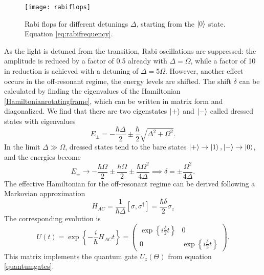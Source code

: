 \begin{figure}[H]
\centering
\texttt{[image: rabiflops]}
\caption{Rabi flops for different detunings $\Delta$, starting from the $\ket{0}$ state. Equation \eqref{eq:rabifrequency}.}
\label{rabiflops}
\end{figure}
As the light is detuned from the transition, Rabi oscillations are suppressed: the amplitude is reduced by a factor of 0.5 already with $\Delta = \Omega$, while a factor of 10 in reduction is achieved with a detuning of $\Delta = 5\Omega$. However, another effect occurs in the off-resonant regime, the energy levels are shifted.
The shift $\delta$ can be calculated by finding the eigenvalues of the Hamiltonian \eqref{Hamiltonianrotatingframe}, which can be written in matrix form and diagonalized. We find that there are two eigenstates $\ket{+}$ and $\ket{-}$ called dressed states with eigenvalues
\begin{equation}
E_{\pm} = -\frac{\hbar\Delta}{2} \pm \frac{\hbar}{2}\sqrt{\Delta^2 +\Omega^2}.
\end{equation}
In the limit $\Delta \gg \Omega$, dressed states tend to the bare states $\ket{+} \to \ket{1},\ket{-}\to \ket{0}$, and the energies become
\begin{equation}
\label{eq:starkshift}
E_{\pm} \to -\frac{\hbar \Omega}{2} \pm \frac{\hbar \Omega}{2} \pm \frac{\hbar \Omega^2}{4\Delta} \implies \delta = \pm\frac{\Omega^2}{4\Delta}.
\end{equation}
The effective Hamiltonian for the off-resonant regime can be derived following a Markovian approximation \cite{acstarkhamiltonian}
\begin{equation}
H_{AC} = \frac{1}{\hbar \Delta} [\sigma,\sigma^\dagger] = \frac{\hbar \delta}{2}\sigma_z
\end{equation}
The corresponding evolution is
\begin{equation}
\label{acstarkrotation}
U(t) = \exp\left\{-\frac{i}{\hbar} H_{AC} t \right\} =
 \begin{pmatrix}
   \exp\left\{i\frac{\delta}{2}t\right\} & 0\\
   0 & \exp\left\{i\frac{\delta}{2}t\right\}
\end{pmatrix}.
\end{equation}
This matrix implements the quantum gate $U_z(\Theta)$ from equation \eqref{quantumgates}.


